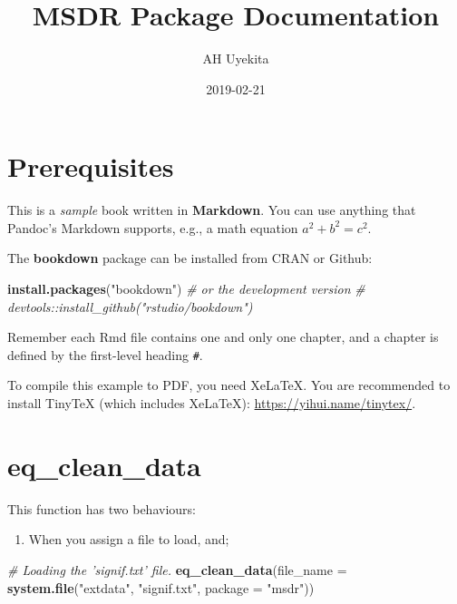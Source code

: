 \documentclass[]{book}
\title{MSDR Package Documentation}
\author{AH Uyekita}
\date{2019-02-21}
\newenvironment{Shaded}{\begin{snugshade}}{\end{snugshade}}
\newcommand{\KeywordTok}[1]{\textcolor[rgb]{0.13,0.29,0.53}{\textbf{#1}}}
\newcommand{\DataTypeTok}[1]{\textcolor[rgb]{0.13,0.29,0.53}{#1}}
\newcommand{\StringTok}[1]{\textcolor[rgb]{0.31,0.60,0.02}{#1}}
\newcommand{\CommentTok}[1]{\textcolor[rgb]{0.56,0.35,0.01}{\textit{#1}}}
\newcommand{\NormalTok}[1]{#1}
\providecommand{\tightlist}{%
  \setlength{\itemsep}{0pt}\setlength{\parskip}{0pt}}
\begin{document}
\maketitle

{
\setcounter{tocdepth}{1}
\tableofcontents
}
\chapter*{Prerequisites}\label{prerequisites}

This is a \emph{sample} book written in \textbf{Markdown}. You can use
anything that Pandoc's Markdown supports, e.g., a math equation
\(a^2 + b^2 = c^2\).

The \textbf{bookdown} package can be installed from CRAN or Github:

\begin{Shaded}
\begin{Highlighting}[]
\KeywordTok{install.packages}\NormalTok{(}\StringTok{"bookdown"}\NormalTok{)}
\CommentTok{# or the development version}
\CommentTok{# devtools::install_github("rstudio/bookdown")}
\end{Highlighting}
\end{Shaded}

Remember each Rmd file contains one and only one chapter, and a chapter
is defined by the first-level heading \texttt{\#}.

To compile this example to PDF, you need XeLaTeX. You are recommended to
install TinyTeX (which includes XeLaTeX):
\url{https://yihui.name/tinytex/}.

\chapter{eq\_clean\_data}\label{eq_clean_data}

This function has two behaviours:

\begin{enumerate}
\def\labelenumi{\arabic{enumi})}
\tightlist
\item
  When you assign a file to load, and;
\end{enumerate}

\begin{Shaded}
\begin{Highlighting}[]
\CommentTok{# Loading the 'signif.txt' file.}
\KeywordTok{eq_clean_data}\NormalTok{(}\DataTypeTok{file_name =} \KeywordTok{system.file}\NormalTok{(}\StringTok{"extdata"}\NormalTok{, }\StringTok{"signif.txt"}\NormalTok{, }\DataTypeTok{package =} \StringTok{"msdr"}\NormalTok{))}
\end{Highlighting}
\end{Shaded}
\end{document}
